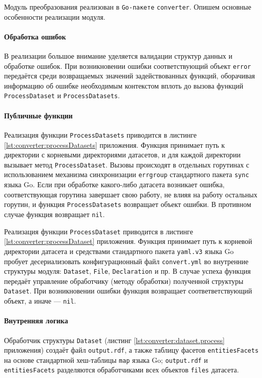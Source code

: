 Модуль преобразования реализован в \texttt{Go-пакете} \texttt{converter}. Опишем основные
особенности реализации модуля.

\paragraph{Обработка ошибок}

В реализации большое внимание уделяется валидации структур данных и обработке ошибок. При возникновении
ошибки соответствующий объект \texttt{error} передаётся среди возвращаемых значений задействованных функций,
оборачивая информацию об ошибке необходимым контекстом вплоть до вызова функций \texttt{ProcessDataset} и
\texttt{ProcessDatasets}.

\paragraph{Публичные функции}

Реализация функции \texttt{ProcessDatasets} приводится в листинге \ref{lst:converter:processDatasets} приложения.
Функция принимает путь к директории с корневыми директориями датасетов, и для каждой директории вызывает метод
\texttt{ProcessDataset}. Вызовы происходят в отдельных горутинах с использованием механизма синхронизации
\texttt{errgroup} стандартного пакета \texttt{sync} языка Go. Если при обработке какого-либо датасета возникает
ошибка, соответствующая горутина завершает свою работу, не влияя на работу остальных горутин, и функция
\texttt{ProcessDatasets} возвращает объект ошибки. В противном случае функция возвращает \texttt{nil}.

Реализация функции \texttt{ProcessDataset} приводится в листинге \ref{lst:converter:processDataset}
приложения. Функция принимает путь к корневой директории датасета и средствами стандартного пакета
\texttt{yaml.v3} языка Go пробует десериализовать конфигурационный файл \texttt{convert.yml} во внутренние
структуры модуля: \texttt{Dataset}, \texttt{File}, \texttt{Declaration} и пр. В случае успеха функция
передаёт управление обработчику (методу обработки) полученной структуры \texttt{Dataset}. При возникновении
ошибки функция возвращает соответветствующий объект, а иначе --- \texttt{nil}.

\paragraph{Внутренняя логика}

Обработчик структуры \texttt{Dataset} (листинг \ref{lst:converter:dataset.process} приложения) создаёт файл
\texttt{output.rdf}, а также таблицу фасетов \texttt{entitiesFacets} на основе стандартной хеш-таблицы
\texttt{map} языка Go; \texttt{output.rdf} и \texttt{entitiesFacets} разделяются обработчиками всех объектов
\texttt{files} датасета.

